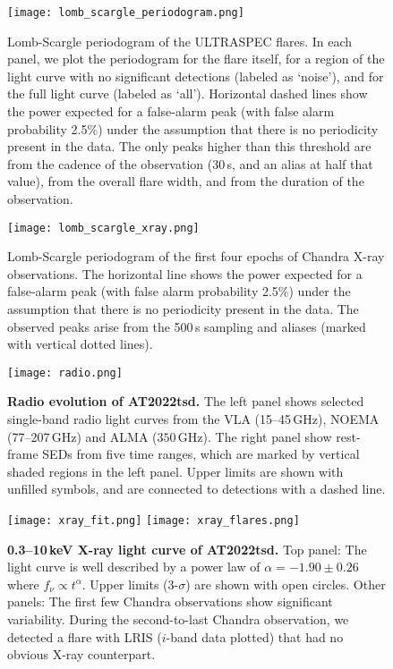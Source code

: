 \documentclass{nature_plusfigure}
\newcommand{\at}{AT2022tsd}
\begin{document}
\begin{extended_data}
\begin{figure*}[ht]
    \centering
    \texttt{[image: lomb\_scargle\_periodogram.png]}
    \caption{Lomb-Scargle periodogram of the ULTRASPEC flares. In each panel, we plot the periodogram for the flare itself, for a region of the light curve with no significant detections (labeled as `noise'), and for the full light curve (labeled as `all'). Horizontal dashed lines show the power expected for a false-alarm peak (with false alarm probability 2.5\%) under the assumption that there is no periodicity present in the data. The only peaks higher than this threshold are from the cadence of the observation (30\,s, and an alias at half that value), from the overall flare width, and from the duration of the observation.}
    \label{fig:ultraspec-periodogram}
\end{figure*}

\begin{figure*}[!ht]
    \centering
    \texttt{[image: lomb\_scargle\_xray.png]}
    \caption{Lomb-Scargle periodogram of the first four epochs of Chandra X-ray observations. The horizontal line shows the power expected for a false-alarm peak (with false alarm probability 2.5\%) under the assumption that there is no periodicity present in the data. The observed peaks arise from the 500\,s sampling and aliases (marked with vertical dotted lines).}
    \label{fig:xray-periodogram}
\end{figure*}

\begin{figure}[!ht]
 \centering
\texttt{[image: radio.png]}
  \caption{\textbf{Radio evolution of \at.} The left panel shows selected single-band radio light curves from the VLA (15--45\,GHz), NOEMA (77--207\,GHz) and ALMA ($350$\,GHz). The right panel show rest-frame SEDs from five time ranges, which are marked by vertical shaded regions in the left panel. Upper limits are shown with unfilled symbols, and are connected to detections with a dashed line.}
 \label{fig:radio}
\end{figure}

\begin{figure}[!ht]
 \centering
\texttt{[image: xray\_fit.png]}
\texttt{[image: xray\_flares.png]}
  \caption{\textbf{0.3--10\,keV X-ray light curve of \at.} Top panel: The light curve is well described by a power law of $\alpha=-1.90\pm0.26$ where $f_\nu \propto t^{\alpha}$. Upper limits (3-$\sigma$) are shown with open circles. Other panels: The first few Chandra observations show significant variability. During the second-to-last Chandra observation, we detected a flare with LRIS ($i$-band data plotted) that had no obvious X-ray counterpart.}
 \label{fig:xray-lc}
\end{figure}


\end{extended_data}
\end{document}
